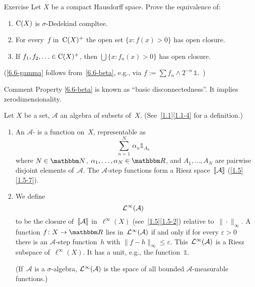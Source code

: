 \documentclass[main.tex]{subfiles}
\begin{document}
\begin{psec}{6.6}{Exercise}
Let $X$ be a compact Hausdorff space.
Prove the equivalence of:
\begin{enumerate}[label=(\greek{*})]
\item\label{6.6-alpha}
$\mathrm{C}(X)$ is $\sigma$-Dedekind compltee.
%
\item\label{6.6-beta}
For every~$f$ in~$\mathrm{C}(X)^+$ the open set $\{x\colon f(x)>0\}$
has open closure.
%
\item\label{6.6-gamma}
If $f_1,f_2,\dotsc\in\mathrm{C}(X)^+$,
then $\bigcup\bigl\{x\colon f_n(x)>0\bigr\}$ has open closure.
\end{enumerate}

(\ref{6.6-gamma} follows from~\ref{6.6-beta},
e.g., via $f:=\sum f_n\wedge 2^{-n} \, \mathbb{1}$.\ )
\end{psec}
\begin{psec*}{Comment}
Property \ref{6.6-beta} 
is known as ``basic disconnectedness''.
It implies zerodimensionality.
\end{psec*}
%
%
\begin{psec}{6.7}%
Let $X$ be a set, $\mathcal A$ an algebra of subsets of~$X$.
(See~\ref{1.1}\ref{1.1-4} for a definition.)
\begin{enumerate}
\item\label{6.7-1}
An $\mathcal A$-
is a function on~$X$,
representable as
\begin{equation*}
\sum_{n=1}^N \,\alpha_n \mathbb{1}_{A_n}
\end{equation*}
where $N\in\N$, $\alpha_1,\dotsc,\alpha_N\in\R$,
and $A_1,\dotsc,A_N$
are pairwise disjoint elements of~$\mathcal A$.
The $\mathcal A$-step functions form a Riesz space~$\lbb \mathcal A \rbb$
(\ref{1.5}\ref{1.5-7}).
%
\item\label{6.7-2}
We define
\begin{equation*}
\mathcal{L}^\infty(\mathcal{A})
\end{equation*}
to be the closure of~$\lbb\mathcal A\rbb$ in~$\ell^\infty(X)$
(see~\ref{1.5}\ref{1.5-2}) relative to~$\|\cdot\|_\infty$.
A function $f\colon X\ra\R$ lies in~$\mathcal{L}^\infty(\mathcal A)$
if and only if for every $\varepsilon>0$
there is an $\mathcal A$-step function~$h$
with $\|f-h\|_\infty\leq\varepsilon$.
This~$\mathcal{L}^\infty(\mathcal A)$ is a Riesz subspace of~$\ell^\infty(X)$.
It has a unit, e.g., the function~$\mathbb{1}$.

(If~$\mathcal A$ is a $\sigma$-algebra,
$\mathcal{L}^\infty(\mathcal A)$ is the space of
all bounded $\mathcal A$-measurable functions.)
\end{enumerate}
\end{psec}
\clearpage
\end{document}
